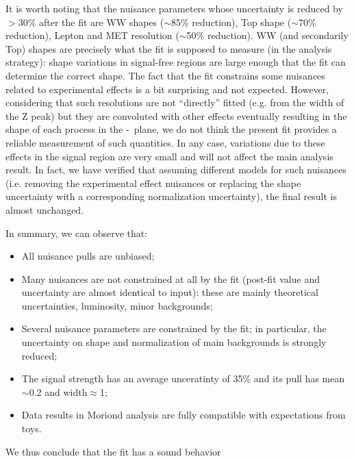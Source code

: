 It is worth noting that the nuisance parameters whose uncertainty is reduced by $>$30\% after the fit are WW shapes ($\sim$85\% reduction), Top shape ($\sim$70\% reduction), 
Lepton and MET resolution ($\sim$50\% reduction).
WW (and secondarily Top) shapes are precisely what the fit is supposed to measure (in the analysis strategy): 
shape variations in signal-free regions are large enough that the fit can determine the correct shape.
The fact that the fit constrains some nuisances related to experimental effects is a bit surprising and not expected.
However, considering that such resolutions are not “directly” fitted (e.g. from the width of the Z peak) but they are convoluted with other 
effects eventually resulting in the shape of each process in the \mt-\mll\ plane, we do not think the present fit provides a reliable measurement 
of such quantities.
In any case, variations due to these effects in the signal region are very small and will not affect the main analysis result.
In fact, we have verified that assuming different models for such nuisances (i.e. removing the experimental effect nuisances or replacing 
the shape uncertainty with a corresponding normalization uncertainty), the final result is almost unchanged.

In summary, we can observe that:
\begin{itemize}
\item All nuisance pulls are unbiased;
\item Many nuisances are not constrained at all by the fit (post-fit value and uncertainty are almost identical to input): 
these are mainly theoretical uncertainties, luminosity, minor backgrounds;
\item Several nuisance parameters are constrained by the fit; in particular, the uncertainty on shape and normalization of main backgrounds is strongly reduced;
\item The signal strength has an average unceratinty of 35\% and its pull has mean $\sim$0.2 and width$\approx$1;
\item Data results in Moriond analysis are fully compatible with expectations from toys.
\end{itemize}

We thus conclude that the fit has a sound behavior
